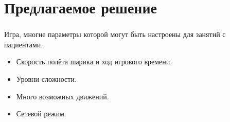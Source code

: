 \section{Предлагаемое решение}

\begin{frame}
\frametitle{\insertsection} 
\framesubtitle{\insertsubsection}
    Игра, многие параметры которой могут быть настроены для занятий с пациентами.
    \begin{itemize}
        \item Скорость полёта шарика и ход игрового времени.
        \item Уровни сложности.
        \item Много возможных движений.
        \item Сетевой режим.
    \end{itemize}
\end{frame}